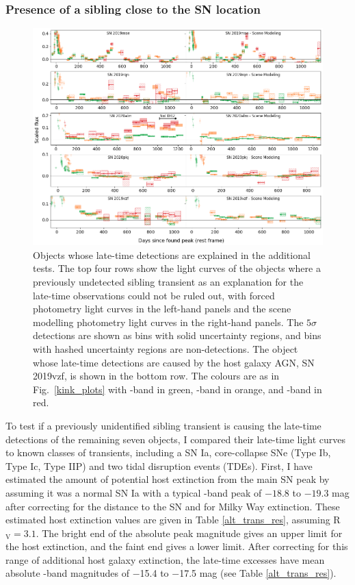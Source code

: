 \documentclass[a4paper,oneside,12pt, class=Latex/Classes/PhDthesisPSnPDF, crop=false]{standalone}
\begin{document}
\subsubsection{Presence of a sibling close to the SN location}
\begin{figure}
 \centering
 \includegraphics[width=\textwidth]{../Images/chapter_3/other_alt_plots.png}
 \caption{Objects whose late-time detections are explained in the additional tests. The top four rows show the light curves of the objects where a previously undetected sibling transient as an explanation for the late-time observations could not be ruled out, with forced photometry light curves in the left-hand panels and the scene modelling photometry light curves in the right-hand panels. The $5\sigma$ detections are shown as bins with solid uncertainty regions, and bins with hashed uncertainty regions are non-detections. The object whose late-time detections are caused by the host galaxy AGN, SN 2019vzf, is shown in the bottom row. The colours are as in Fig.~\ref{kink_plots} with \ztfg-band in green, \ztfr-band in orange, and \ztfi-band in red.}
 \label{other_alt}
\end{figure}

To test if a previously unidentified sibling transient is causing the late-time detections of the remaining seven objects, I compared their late-time light curves to known classes of transients, including a SN Ia, core-collapse SNe (Type Ib, Type Ic, Type IIP) and two tidal disruption events (TDEs). First, I have estimated the amount of potential host extinction from the main SN peak by assuming it was a normal SN Ia with a typical \ztfg-band peak of $-18.8$ to $-19.3$ mag after correcting for the distance to the SN and for Milky Way extinction. These estimated host extinction values are given in Table \ref{alt_trans_res}, assuming R$_\text{V} = 3.1$. The bright end of the absolute peak magnitude gives an upper limit for the host extinction, and the faint end gives a lower limit. After correcting for this range of additional host galaxy extinction, the late-time excesses have mean absolute \ztfr-band magnitudes of $-$15.4 to $-$17.5 mag (see Table \ref{alt_trans_res}).
\end{document}
